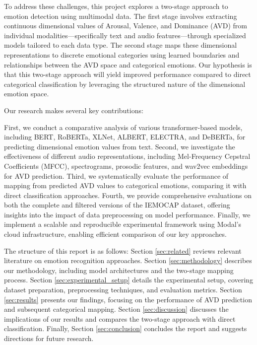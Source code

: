 \documentclass[12pt]{article}
\begin{document}
To address these challenges, this project explores a two-stage approach to emotion detection using multimodal data. The first stage involves extracting continuous dimensional values of Arousal, Valence, and Dominance (AVD) from individual modalities—specifically text and audio features—through specialized models tailored to each data type. The second stage maps these dimensional representations to discrete emotional categories using learned boundaries and relationships between the AVD space and categorical emotions. Our hypothesis is that this two-stage approach will yield improved performance compared to direct categorical classification by leveraging the structured nature of the dimensional emotion space.

Our research makes several key contributions:

First, we conduct a comparative analysis of various transformer-based models, including BERT, RoBERTa, XLNet, ALBERT, ELECTRA, and DeBERTa, for predicting dimensional emotion values from text. Second, we investigate the effectiveness of different audio representations, including Mel-Frequency Cepstral Coefficients (MFCC), spectrograms, prosodic features, and wav2vec embeddings for AVD prediction. Third, we systematically evaluate the performance of mapping from predicted AVD values to categorical emotions, comparing it with direct classification approaches. Fourth, we provide comprehensive evaluations on both the complete and filtered versions of the IEMOCAP dataset, offering insights into the impact of data preprocessing on model performance. Finally, we implement a scalable and reproducible experimental framework using Modal's cloud infrastructure, enabling efficient comparison of our key approaches.
    
The structure of this report is as follows: Section \ref{sec:related} reviews relevant literature on emotion recognition approaches. Section \ref{sec:methodology} describes our methodology, including model architectures and the two-stage mapping process. Section \ref{sec:experimental_setup} details the experimental setup, covering dataset preparation, preprocessing techniques, and evaluation metrics. Section \ref{sec:results} presents our findings, focusing on the performance of AVD prediction and subsequent categorical mapping. Section \ref{sec:discussion} discusses the implications of our results and compares the two-stage approach with direct classification. Finally, Section \ref{sec:conclusion} concludes the report and suggests directions for future research.
    
\end{document}
